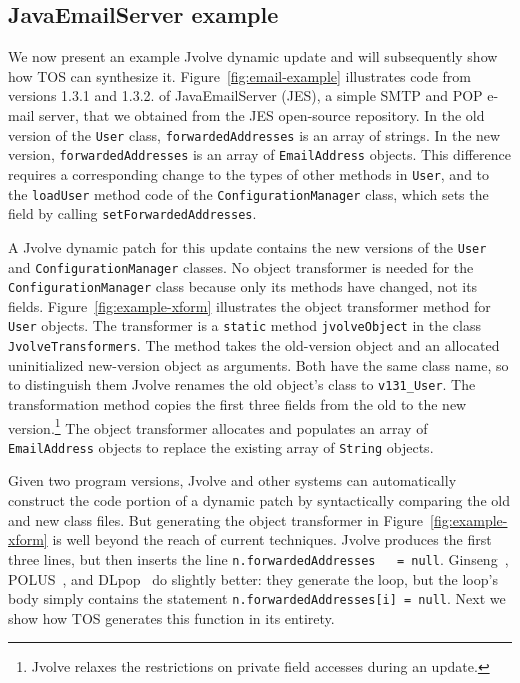 \documentclass[natbib]{sigplanconf}
\newcommand{\code}[1]{\lstinline|#1|\xspace}
\newcommand{\TOS}{TOS\xspace}
\begin{document}

\subsection{JavaEmailServer example}

We now present an example Jvolve dynamic
update and will subsequently show how \TOS can synthesize it.
Figure~\ref{fig:email-example} illustrates code from versions
1.3.1 and 1.3.2. of JavaEmailServer (JES), a simple SMTP and POP e-mail
server, that we obtained from the JES open-source repository.  In the
old version of the \code{User} class, \code{forwardedAddresses} is an
array of strings.  In the new version, \code{forwardedAddresses} is an
array of \code{EmailAddress} objects.  This difference requires a
corresponding change to the types of other methods in \code{User}, and
to the \code{loadUser} method code of the \code{ConfigurationManager}
class, which sets the field by calling \code{setForwardedAddresses}.

A Jvolve dynamic patch for this update contains the new versions of
the \code{User} and \code{ConfigurationManager} classes.  No object
transformer is needed for the \code{ConfigurationManager} class
because only its methods have changed, not its fields.
Figure~\ref{fig:example-xform} illustrates the object transformer
method for \code{User} objects. The transformer is a \code{static}
method \code{jvolveObject} in the class \code{JvolveTransformers}.
The method takes the old-version object and an allocated uninitialized
new-version object as arguments.  Both have the same class name, so to
distinguish them Jvolve renames the old object's class to
\code{v131_User}.  The transformation method copies the first three
fields from the old to the new version.\footnote{Jvolve relaxes the
  restrictions on private field accesses during an update.}  The
object transformer  
allocates and populates an array of \code{EmailAddress} objects to
replace the existing array of \code{String} objects.

Given two program versions, Jvolve and other systems can automatically
construct the code portion of a dynamic patch by syntactically
comparing the old and new class files.  But 
generating the object transformer in Figure~\ref{fig:example-xform} is
well beyond the reach of current techniques.  Jvolve produces the
first three lines, but then inserts the line \code{n.forwardedAddresses
  = null}.  Ginseng~\cite{neamtiu06dsu}, POLUS~\cite{chen:icse07}, and
DLpop~\cite{HicksNettles03} do slightly better: they
generate the loop, but the loop's body simply contains
the statement \code{n.forwardedAddresses[i] = null}. Next we show how
\TOS generates this function in its entirety.
\end{document}
